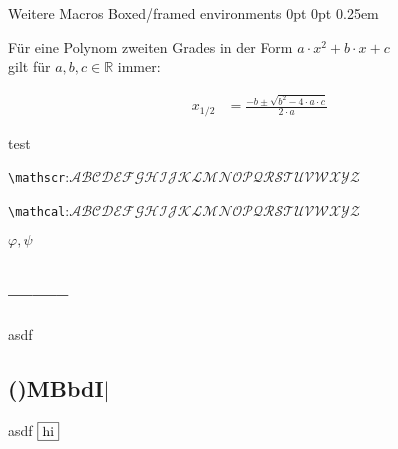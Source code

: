 \documentclass[
    ngerman,
    color=1b,
    load_common,
    submission,
    boxarc,
    fleqn,
    T1,
]{rubos-tuda-template}
\begin{document}
\begin{task}[points=2,solution=true]{Weitere Macros}
    Boxed/framed environments
    {0pt}%
    {0pt}%
    {\normalfont}%
    {}%
    {\small\bfseries\sffamily\color{accentcolor}}%
    {\;}%
    {0.25em}%
    {
        \small\sffamily\color{accentcolor}\space{}%
    }
    \begin{definition}[Mitternachtsformel] Für eine Polynom zweiten Grades in der Form $a\cdot x^2+b\cdot x + c$ \\gilt für $a,b,c \in \mathbb{R}$ immer:%

            \begin{align}
                x_{1/2} & =\frac{-b\pm\sqrt{b^{2}-4\cdot a \cdot c}}{2\cdot a}
            \end{align}

    \end{definition}
    \begin{definition}
        test
    \end{definition}
    \verb+\mathscr+:$\mathscr{ABCDEFGHIJKLMNOPQRSTUVWXYZ}$

    \verb+\mathcal+:$\mathcal{ABCDEFGHIJKLMNOPQRSTUVWXYZ}$

    $\varphi, \psi$

    \begin{minipage}[t]{.5\textwidth-1pt}
        \subsection{--------} %
        asdf
    \end{minipage}\hspace{2pt}%
    \begin{minipage}[t]{.5\textwidth-1pt}
        \subsection{\texorpdfstring{()MBbdI$\vert$}{()MBbdI|}} %
        asdf $\vcenter{\hbox{\tikz{\node[draw]{hi};}}}$
    \end{minipage}
\end{task}
\end{document}
